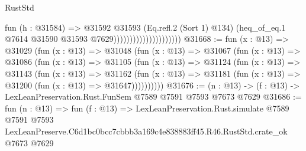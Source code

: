 \begin{lexlean}{RustStd}
\begin{coremodule}
                                          fun (h : @31584) =>
                                          @31592
                                            @31593
                                            (Eq.refl.{2} (Sort 1) @134)
                                            (heq_of_eq.{1}
                                              @7614
                                              @31590
                                              @31593
                                              @7629)))))))))))))))))))))
@31668 := fun (x : @13) =>
  @31029
    (fun (x : @13) =>
    @31048
      (fun (x : @13) =>
      @31067
        (fun (x : @13) =>
        @31086
          (fun (x : @13) =>
          @31105
            (fun (x : @13) =>
            @31124
              (fun (x : @13) =>
              @31143
                (fun (x : @13) =>
                @31162
                  (fun (x : @13) =>
                  @31181 (fun (x : @13) => @31200 (fun (x : @13) => @31647))))))))))
@31676 := (n : @13) -> (f : @13) -> LexLeanPreservation.Rust.FunSem @7589 @7591 @7593 @7673 @7629
@31686 := fun (n : @13) =>
  fun (f : @13) =>
  LexLeanPreservation.Rust.simulate
    @7589
    @7591
    @7593
    LexLeanPreserve.C6d1bc0bcc7cbbb3a169c4e838883ff45.R46.RustStd.crate_ok
    @7673
    @7629
\end{coremodule}
\end{lexlean}

